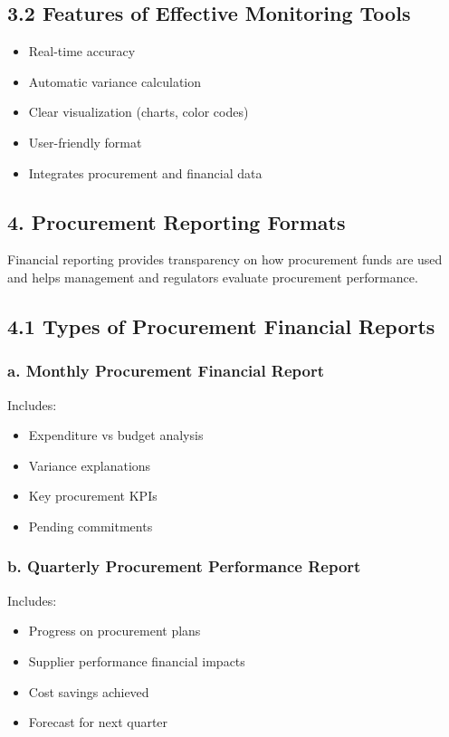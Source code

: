 \documentclass[10pt]{article}
\begin{document}
\subsection*{3.2 Features of Effective Monitoring Tools}
\begin{itemize}
  \item Real-time accuracy
  \item Automatic variance calculation
  \item Clear visualization (charts, color codes)
  \item User-friendly format
  \item Integrates procurement and financial data
\end{itemize}

\subsection*{4. Procurement Reporting Formats}
Financial reporting provides transparency on how procurement funds are used and helps management and regulators evaluate procurement performance.

\subsection*{4.1 Types of Procurement Financial Reports}
\subsubsection*{a. Monthly Procurement Financial Report}
Includes:

\begin{itemize}
  \item Expenditure vs budget analysis
  \item Variance explanations
  \item Key procurement KPIs
  \item Pending commitments
\end{itemize}

\subsubsection*{b. Quarterly Procurement Performance Report}
Includes:

\begin{itemize}
  \item Progress on procurement plans
  \item Supplier performance financial impacts
  \item Cost savings achieved
  \item Forecast for next quarter
\end{itemize}
\end{document}
